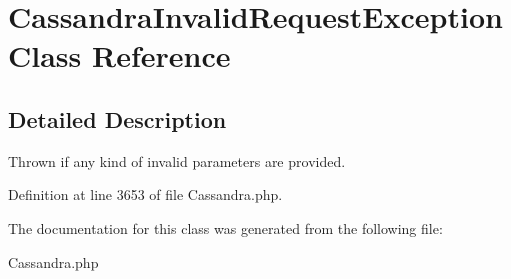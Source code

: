 \hypertarget{classCassandraInvalidRequestException}{
\section{CassandraInvalidRequestException Class Reference}
\label{classCassandraInvalidRequestException}
}


\subsection{Detailed Description}
Thrown if any kind of invalid parameters are provided. 

Definition at line 3653 of file Cassandra.php.



The documentation for this class was generated from the following file:\begin{DoxyCompactItemize}
\item 
Cassandra.php\end{DoxyCompactItemize}
